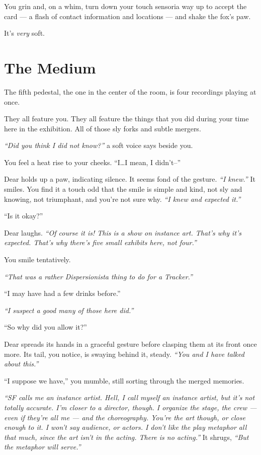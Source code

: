 You grin and, on a whim, turn down your touch sensoria way up to accept the card --- a flash of contact information and locations --- and shake the fox's paw.

It's \emph{very} soft.

\newpage
\section*{The Medium}

The fifth pedestal, the one in the center of the room, is four recordings playing at once.

They all feature you. They all feature the things that you did during your time here in the exhibition. All of those sly forks and subtle mergers.

\emph{``Did you think I did not know?''} a soft voice says beside you.

You feel a heat rise to your cheeks. ``I\ldots{}I mean, I didn't--''

Dear holds up a paw, indicating silence. It seems fond of the gesture. \emph{``I knew.''} It smiles. You find it a touch odd that the smile is simple and kind, not sly and knowing, not triumphant, and you're not sure why. \emph{``I knew and expected it.''}

``Is it okay?''

Dear laughs. \emph{``Of course it is! This is a show on instance art. That's why it's expected. That's why there's five small exhibits here, not four.''}

You smile tentatively.

\emph{``That was a rather Dispersionista thing to do for a Tracker.''}

``I may have had a few drinks before.''

\emph{``I suspect a good many of those here did.''}

``So why did you allow it?''

Dear spreads its hands in a graceful gesture before clasping them at its front once more. Its tail, you notice, is swaying behind it, steady. \emph{``You and I have talked about this.''}

``I suppose we have,'' you mumble, still sorting through the merged memories.

\emph{``SF calls me an instance artist. Hell, I call myself an instance artist, but it's not totally accurate. I'm closer to a director, though. I organize the stage, the crew --- even if they're all me --- and the choreography. You're the art though, or close enough to it. I won't say audience, or actors. I don't like the play metaphor all that much, since the art isn't in the acting. There is no acting.''}  It shrugs, \emph{``But the metaphor will serve.''}

